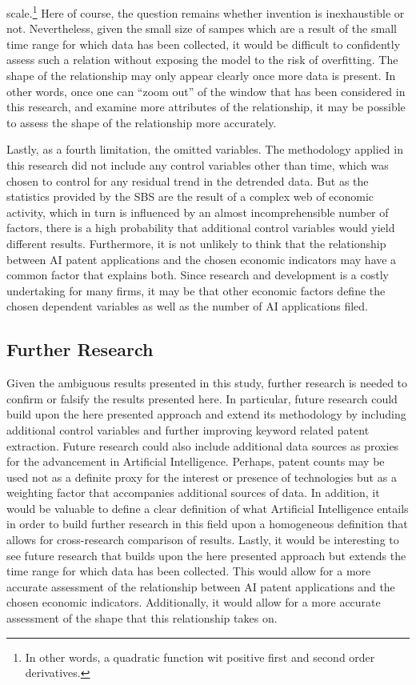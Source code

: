 \documentclass[
  12pt,
  a4paperpaper,
]{article}
\begin{document}
scale.\footnote{In other words, a quadratic function wit positive first
  and second order derivatives.} Here of course, the question remains
whether invention is inexhaustible or not. Nevertheless, given the small
size of sampes which are a result of the small time range for which data
has been collected, it would be difficult to confidently assess such a
relation without exposing the model to the risk of overfitting. The
shape of the relationship may only appear clearly once more data is
present. In other words, once one can ``zoom out'' of the window that
has been considered in this research, and examine more attributes of the
relationship, it may be possible to assess the shape of the relationship
more accurately.

Lastly, as a fourth limitation, the omitted variables. The methodology
applied in this research did not include any control variables other
than time, which was chosen to control for any residual trend in the
detrended data. But as the statistics provided by the SBS are the result
of a complex web of economic activity, which in turn is influenced by an
almost incomprehensible number of factors, there is a high probability
that additional control variables would yield different results.
Furthermore, it is not unlikely to think that the relationship between
AI patent applications and the chosen economic indicators may have a
common factor that explains both. Since research and development is a
costly undertaking for many firms, it may be that other economic factors
define the chosen dependent variables as well as the number of AI
applications filed.

\subsection{Further Research}\label{sec-further-research}

Given the ambiguous results presented in this study, further research is
needed to confirm or falsify the results presented here. In particular,
future research could build upon the here presented approach and extend
its methodology by including additional control variables and further
improving keyword related patent extraction. Future research could also
include additional data sources as proxies for the advancement in
Artificial Intelligence. Perhaps, patent counts may be used not as a
definite proxy for the interest or presence of technologies but as a
weighting factor that accompanies additional sources of data. In
addition, it would be valuable to define a clear definition of what
Artificial Intelligence entails in order to build further research in
this field upon a homogeneous definition that allows for cross-research
comparison of results. Lastly, it would be interesting to see future
research that builds upon the here presented approach but extends the
time range for which data has been collected. This would allow for a
more accurate assessment of the relationship between AI patent
applications and the chosen economic indicators. Additionally, it would
allow for a more accurate assessment of the shape that this relationship
takes on.
\end{document}
